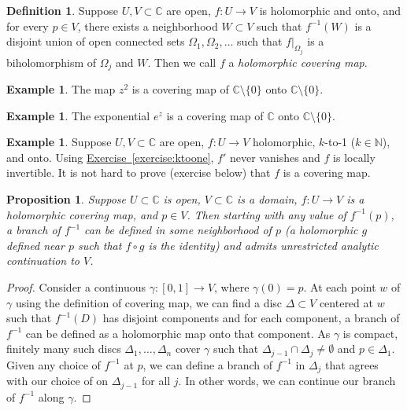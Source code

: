 \documentclass[12pt,openany]{book}
\newcommand{\C}{{\mathbb{C}}}
\newcommand{\N}{{\mathbb{N}}}
\newcommand{\myindex}[1]{#1\index{#1}}
\theoremstyle{plain}
\newtheorem{prop}[thm]{Proposition}
\theoremstyle{remark}
\theoremstyle{definition}
\newtheorem{defn}[thm]{Definition}
\theoremstyle{exercise}
\theoremstyle{example}
\newtheorem{example}[thm]{Example}
\newcommand{\exerciseref}[1]{\hyperref[#1]{Exercise~\ref*{#1}}}
\begin{document}
\begin{defn}
Suppose $U,V \subset \C$ are open, $f \colon U \to V$ is holomorphic
and onto, and for every $p \in V$, there exists a neighborhood $W \subset
V$ such that $f^{-1}(W)$ is a disjoint union of open connected sets
$\Omega_1,\Omega_2,\ldots$ such that $f|_{\Omega_j}$ is a biholomorphism of
$\Omega_j$ and $W$.
Then we call $f$ a \emph{\myindex{holomorphic covering map}}.
\end{defn}

\begin{example}
The map $z^2$ is a covering map of $\C \setminus \{ 0 \}$ onto $\C \setminus \{ 0 \}$.
\end{example}

\begin{example}
The exponential $e^z$ is a covering map of $\C$ onto $\C \setminus \{ 0 \}$.
\end{example}

\begin{example}
Suppose $U,V \subset \C$ are open, $f \colon U \to V$ holomorphic, $k$-to-1
($k \in \N$), and onto.
Using \exerciseref{exercise:ktoone}, $f'$ never vanishes and
$f$ is locally invertible.  It is not hard to
prove (exercise below) that $f$ is a covering map.
\end{example}

\begin{prop}
Suppose $U \subset \C$ is open, $V \subset \C$ is a domain,
$f \colon U \to V$ is a holomorphic covering map, and $p \in V$.
Then starting with any value of $f^{-1}(p)$, a branch of $f^{-1}$
can be defined in some neighborhood
of $p$ (a holomorphic $g$ defined near $p$ such that $f \circ g$ is the
identity) and admits unrestricted analytic continuation to $V$.
\end{prop}

\begin{proof}
Consider a continuous $\gamma \colon [0,1] \to V$, where $\gamma(0) = p$.
At each point $w$ of $\gamma$ using the definition of covering map,
we can find a disc $\Delta \subset V$ centered at $w$ such that $f^{-1}(D)$ has 
disjoint components and for each component, a branch of $f^{-1}$ can be defined as a
holomorphic map onto that component.  As $\gamma$ is compact, finitely many
such discs $\Delta_1,\ldots,\Delta_n$ cover $\gamma$ such that $\Delta_{j-1}
\cap \Delta_j \not= \emptyset$ and $p \in \Delta_1$.  Given any choice
of $f^{-1}$ at $p$, we can define a branch of $f^{-1}$ in $\Delta_j$ that agrees with
our choice of on $\Delta_{j-1}$ for all $j$.  In other words, we can
continue our branch of $f^{-1}$
along $\gamma$.
\end{proof}
\end{document}
